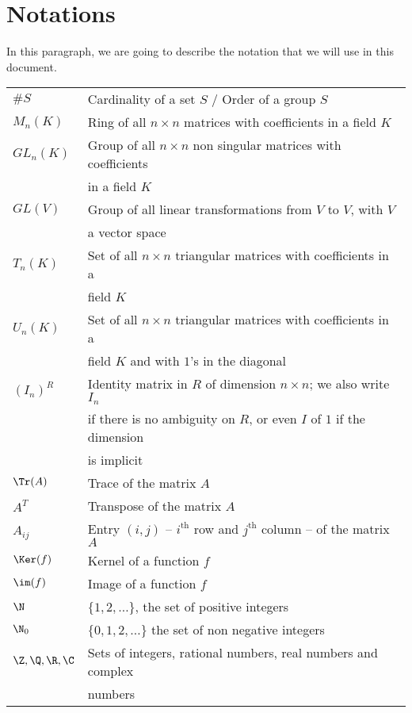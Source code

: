 \newpage
\section*{Notations}

In this paragraph, we are going to describe the notation that we will use in this document. \\

\begin{tabular}{ll}
   $\#S$ & Cardinality of a set $S$ / Order of a group $S$ \\
   $M_n(K)$ & Ring of all $n \times n$ matrices with coefficients in a field $K$ \\
   $GL_n(K)$ & Group of all $n \times n$ non singular matrices with coefficients \\ & in a field $K$\\
   $GL(V)$ & Group of all linear transformations from $V$ to $V$, with $V$ \\ & a vector space \\
   $T_n(K)$ & Set of all $n \times n$ triangular matrices with coefficients in a \\&field $K$ \\
   $U_n(K)$ & Set of all $n \times n$ triangular matrices with coefficients in a \\&field $K$ and with $1$'s in the diagonal\\
   $(I_n)^R$ & Identity matrix in $R$ of dimension $n \times n$; we also write $I_n$ \\& if there is no ambiguity on $R$, or even $I$ of $1$ if the dimension \\& is implicit \\
   $\Tr(A)$ & Trace of the matrix $A$ \\
   $A^T$ & Transpose of the matrix $A$ \\
   $A_{ij}$ & Entry $(i,j)$ -- $i^{\text{th}}$ row and $j^{\text{th}}$ column -- of the matrix $A$\\
   $\Ker(f)$ & Kernel of a function $f$ \\
   $\im(f)$ & Image of a function $f$ \\
   $\N$ & $\{1,2,\ldots\}$, the set of positive integers \\
   $\N_0$ & $\{0,1,2,\ldots\}$ the set of non negative integers\\
   $\Z, \Q, \R, \C$ & Sets of integers, rational numbers, real numbers and complex \\& numbers \\

\end{tabular}
